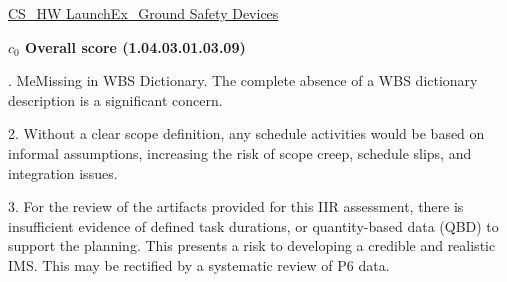 % 


\begin{frame}{\href{run:../local/source-docs/1.04.03.01.03.09.pdf}{CS\_HW LaunchEx\_Ground Safety Devices}}
\centering
{}
\par
\vspace{0.75em}
\textbf{\small{\(c_0\) Overall score {\tiny (1.04.03.01.03.09)}}}\\\par
\vspace{0.5em}
\begin{minipage}{0.85\textwidth}
\raggedright
\fontsize{7}{9}. MeMissing in WBS Dictionary. The complete absence of a WBS dictionary description is a significant concern.\par\vspace{0.5em}2. Without a clear scope definition, any schedule activities would be based on informal assumptions, increasing the risk of scope creep, schedule slips, and integration issues.\par\vspace{0.5em}3. For the review of the artifacts provided for this IIR assessment, there is insufficient evidence of defined task durations, or quantity-based data (QBD) to support the planning. This presents a risk to developing a credible and realistic IMS. This may be rectified by a systematic review of P6 data.\par
\end{minipage}
\end{frame}
%
